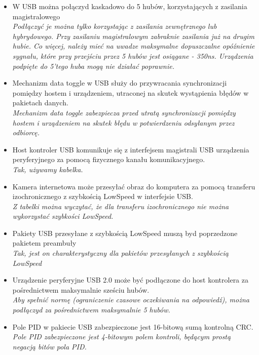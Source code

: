 \documentclass[a4paper,twoside]{article}
\begin{document}
\begin{itemize}
	\item \textcolor{nie}{W USB można połączyd kaskadowo do 5 hubów, korzystających z zasilania magistralowego} \\
	{\small \emph{Podłączyć je można tylko korzystając z zasilania zewnętrznego lub hybrydowego. Przy zasilaniu magistralowym zabraknie zasilania już na drugim hubie. Co więcej, należy mieć na uwadze maksymalne dopuszczalne opóźnienie sygnału, które przy przejściu przez 5 hubów jest osiągane - 350ns. Urządzenia podpięte do 5'tego huba mogą nie działać poprawnie.}}
	
	\item \textcolor{nie}{Mechanizm data toggle w USB służy do przywracania synchronizacji pomiędzy hostem i urządzeniem, utraconej na skutek wystąpienia błędów w pakietach danych.} \\
	{\small \emph{Mechanizm data toggle zabezpiecza przed utratą synchronizacji pomiędzy hostem i urządzeniem na skutek błędu w potwierdzeniu odsyłanym przez odbiorcę.}}
	
	\item \textcolor{tak}{Host kontroler USB komunikuje się z interfejsem magistrali USB urządzenia peryferyjnego za pomocą fizycznego kanału komunikacyjnego.} \\
	{\small \emph{Tak, używamy kabelka.}}
	
	\item \textcolor{nie}{Kamera internetowa może przesyłać obraz do komputera za pomocą transferu izochronicznego z szybkością LowSpeed w interfejsie USB.} \\
	{\small \emph{Z tabelki można wyczytać, że dla transferu izochronicznego nie można wykorzystać szybkości LowSpeed.}}
	
	\item \textcolor{tak}{Pakiety USB przesyłane z szybkością LowSpeed muszą byd poprzedzone pakietem preambuły} \\
	{\small \emph{Tak, jest on charakterystyczny dla pakietów przesyłanych z szybkością LowSpeed}}
	
	\item \textcolor{nie}{Urządzenie peryferyjne USB 2.0 może być podłączone do host kontrolera za pośrednictwem maksymalnie sześciu hubów.} \\
	{\small \emph{Aby spełnić normę (ograniczenie czasowe oczekiwania na odpowiedź), można podłączyd za pośrednictwem maksymalnie 5 hubów.}}
	
	\item \textcolor{nie}{Pole PID w pakiecie USB zabezpieczone jest 16-bitową sumą kontrolną CRC.} \\
	{\small \emph{Pole PID zabezpieczone jest 4-bitowym polem kontroli, będącym prostą negacją bitów pola PID.}}
	

\end{itemize}
\end{document}
